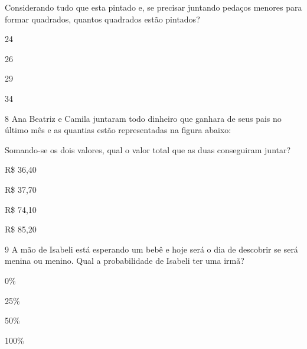Considerando tudo que esta pintado e, se precisar juntando pedaços
menores para formar quadrados, quantos quadrados estão pintados?

\begin{escolha}
\item
  24
\item
  26
\item
  29
\item
  34
\end{escolha}


\num{8} Ana Beatriz e Camila juntaram todo dinheiro que ganhara de seus
pais no último mês e as quantias estão representadas na figura abaixo:


Somando-se os dois valores, qual o valor total que as duas conseguiram
juntar?

\begin{escolha}
\item
  R\$ 36,40
\item
  R\$ 37,70
\item
  R\$ 74,10
\item
  R\$ 85,20
\end{escolha}


\num{9} A mão de Isabeli está esperando um bebê e hoje será o dia de
descobrir se será menina ou menino. Qual a probabilidade de Isabeli ter
uma irmã?

\begin{escolha}
\item
  0\%
\item
  25\%
\item
  50\%
\item
  100\%
\end{escolha}

